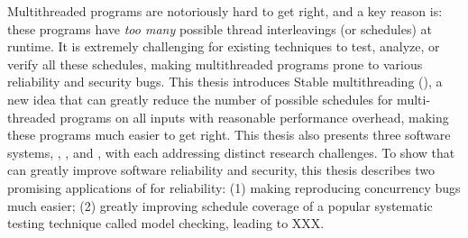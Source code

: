 Multithreaded programs are notoriously hard to get right, and a key reason is: these programs have \emph{too many} possible thread interleavings (or schedules) at runtime. It is extremely challenging for existing techniques to test, analyze, or verify all these schedules, making multithreaded programs prone to various reliability and security bugs. This thesis introduces Stable multithreading (\smt), a new idea that can greatly reduce the number of possible schedules for multi-threaded programs on all inputs with reasonable performance overhead, making these programs much easier to get right. This thesis also presents three \smt software systems, \tern, \peregrine, and \parrot, with each addressing distinct research challenges. To show that \smt can greatly improve software reliability and security, this thesis describes two promising applications of \smt for reliability: (1) making reproducing concurrency bugs much easier; (2) greatly improving schedule coverage of a popular systematic testing technique called model checking, leading to XXX.
